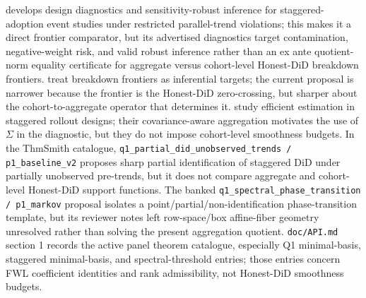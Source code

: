 \documentclass[11pt]{article}
\theoremstyle{definition}
\theoremstyle{plain}
\theoremstyle{remark}
\begin{document}
\citet{wright2026designrobust} develops design diagnostics and sensitivity-robust inference for staggered-adoption event studies under restricted parallel-trend violations; this makes it a direct frontier comparator, but its advertised diagnostics target contamination, negative-weight risk, and valid robust inference rather than an ex ante quotient-norm equality certificate for aggregate versus cohort-level Honest-DiD breakdown frontiers.
\citet{masten2020breakdown} treat breakdown frontiers as inferential targets; the current proposal is narrower because the frontier is the Honest-DiD zero-crossing, but sharper about the cohort-to-aggregate operator that determines it.
\citet{rothsantanna2023efficient} study efficient estimation in staggered rollout designs; their covariance-aware aggregation motivates the use of \(\Sigma\) in the diagnostic, but they do not impose cohort-level smoothness budgets.
In the ThmSmith catalogue, \texttt{q1\_partial\_did\_unobserved\_trends / p1\_baseline\_v2} proposes sharp partial identification of staggered DiD under partially unobserved pre-trends, but it does not compare aggregate and cohort-level Honest-DiD support functions.
The banked \texttt{q1\_spectral\_phase\_transition / p1\_markov} proposal isolates a point/partial/non-identification phase-transition template, but its reviewer notes left row-space/box affine-fiber geometry unresolved rather than solving the present aggregation quotient.
\texttt{doc/API.md} section 1 records the active panel theorem catalogue, especially Q1 minimal-basis, staggered minimal-basis, and spectral-threshold entries; those entries concern FWL coefficient identities and rank admissibility, not Honest-DiD smoothness budgets.
\end{document}

